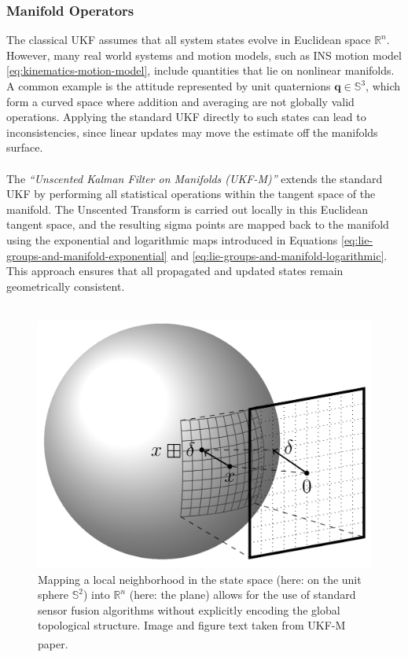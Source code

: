 \subsubsection{Manifold Operators}
The classical UKF assumes that all system states evolve in Euclidean space $\mathbb{R}^n$. However, many real world systems and motion models, such as INS motion model \ref{eq:kinematics-motion-model}, include quantities that lie on nonlinear manifolds. A common example is the attitude represented by unit quaternions $\mathbf{q} \in \mathbb{S}^3$, which form a curved space where addition and averaging are not globally valid operations. Applying the standard UKF directly to such states can lead to inconsistencies, since linear updates may move the estimate off the manifolds surface.  
\\ \\
The \textit{``Unscented Kalman Filter on Manifolds (UKF-M)''} \cite{ukf_manifold} extends the standard UKF by performing all statistical operations within the tangent space of the manifold. The Unscented Transform is carried out locally in this Euclidean tangent space, and the resulting sigma points are mapped back to the manifold using the exponential and logarithmic maps introduced in Equations \ref{eq:lie-groups-and-manifold-exponential} and \ref{eq:lie-groups-and-manifold-logarithmic}. This approach ensures that all propagated and updated states remain geometrically consistent.  
\\ \\
\begin{figure}[H]
    \centering
    \includegraphics[width=0.7\linewidth]{Pictures/State_Estimation/Unscented_Kalman_Filter_on_Manifolds/Manifold_Mapping.png}
    \caption{Mapping a local neighborhood in the state space (here: on the unit sphere $\mathbb{S}^2$) into $\mathbb{R}^n$ (here: the plane) allows for the use of standard sensor fusion algorithms without explicitly encoding the global topological structure. Image and figure text taken from UKF-M paper.\textsuperscript{\cite{ukf_manifold}}}
    \label{fig:state-estimation-manifold-mapping}
\end{figure}
